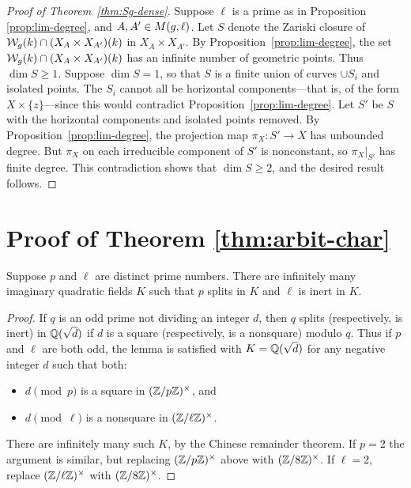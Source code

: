 \documentclass{amsart}
\begin{document}
\begin{proof}[Proof of Theorem~\ref{thm:Sg-dense}]
Suppose $\ell$ is a prime as in Proposition \ref{prop:lim-degree}, and $A,A'\in M(g,\ell)$.
  Let $S$ denote the Zariski closure of $\mathcal{W}_g(k) \cap (X_A \times X_{A'})(k)$ in $X_A \times X_{A'}$. By Proposition~\ref{prop:lim-degree}, the set $\mathcal{W}_g(k) \cap (X_A \times X_{A'})(k)$ has an infinite number of geometric points. Thus $\dim S \geq 1$. Suppose $\dim S = 1$, so that $S$ is a finite union of curves $\cup S_i$ and isolated points. The $S_i$ cannot all be horizontal components---that is, of the form $X \times \{z\}$---since this would contradict Proposition~\ref{prop:lim-degree}. Let $S'$ be $S$ with the horizontal components and isolated points removed. By Proposition~\ref{prop:lim-degree}, the projection map $\pi_X: S' \to X$ has unbounded degree. But $\pi_X$ on each irreducible component of $S'$ is nonconstant, so $\pi_X|_{S'}$ has finite degree. This contradiction shows that $\dim S \geq 2$, and the desired result follows.
\end{proof}







\section{Proof of Theorem \ref{thm:arbit-char}}
\label{sec:characteristic-p}

\begin{lemma}\label{lemma:travis-lemma}
Suppose $p$ and $\ell$ are distinct prime numbers.  There are infinitely many 
imaginary quadratic fields $K$ such that $p$ splits in $K$ and $\ell$ is inert in $K$.
\end{lemma}

\begin{proof}
If $q$ is an odd prime not dividing an integer $d$, then $q$ splits (respectively, is inert) 
in $\mathbb{Q}(\sqrt{d})$ if $d$ is a square (respectively, is a nonsquare) modulo $q$.  
Thus if $p$ and $\ell$ are both odd, the lemma is satisfied with $K = \mathbb{Q}(\sqrt{d})$ 
for any negative integer $d$ such that both:
\begin{itemize}
\item
$d \pmod{p}$ is a square in $(\mathbb{Z}/p\mathbb{Z})^\times$, and 
\item
$d \pmod{\ell}$ is a nonsquare in $(\mathbb{Z}/\ell\mathbb{Z})^\times$.
\end{itemize}
There are infinitely many such $K$, by the Chinese remainder theorem.
If $p=2$ the argument is similar, but replacing $(\mathbb{Z}/p\mathbb{Z})^\times$ above with 
$(\mathbb{Z}/8\mathbb{Z})^\times$.  If $\ell = 2$, replace 
$(\mathbb{Z}/\ell\mathbb{Z})^\times$ with $(\mathbb{Z}/8\mathbb{Z})^\times$.
\end{proof}
\end{document}
